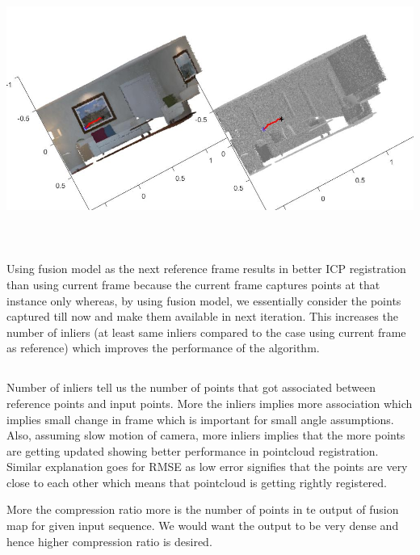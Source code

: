 \documentclass[fleqn]{article}
\begin{document}
\begin{adjustwidth}{4em}{0pt}
	\includegraphics[width = 1\textwidth,center]{slam_hw3_q2_d_part2_pic3.jpg}\\ \\
	
\end{adjustwidth}

\section{}
\subsection{}
\begin{adjustwidth}{4em}{0pt}
	Using fusion model as the next reference frame results in better ICP registration than using current frame because the current frame captures points at that instance only whereas, by using fusion model, we essentially consider the points captured till now and make them available in next iteration. This increases the number of inliers (at least same inliers compared to the case using current frame as reference) which improves the performance of the algorithm.
	
\end{adjustwidth}

\subsection{}
\begin{adjustwidth}{4em}{0pt}
	Number of inliers tell us the number of points that got associated between reference points and input points. More the inliers implies more association which implies small change in frame which is important for small angle assumptions. Also, assuming slow motion of camera, more inliers implies that the more points are getting updated showing better performance in pointcloud registration.
	Similar explanation goes for RMSE as low error signifies that the points are very close to each other which means that pointcloud is getting rightly registered. \newline
	
	More the compression ratio more is the number of points in te output of fusion map for given input sequence. We would want the output to be very dense and hence higher compression ratio is desired.
\end{adjustwidth}
\end{document}
